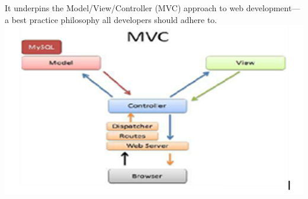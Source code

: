 \textbullet \hspace{0.2cm}	It underpins the Model/View/Controller (MVC) approach to web development—a best practice philosophy all developers should adhere to.\\

\includegraphics[scale=1.0]{Ch2/mvc.png}


\label{fig:MVC Model}



